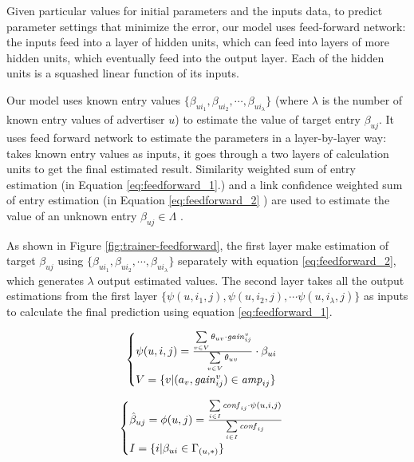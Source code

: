 Given particular values for initial parameters and the inputs data, to
predict parameter settings that minimize the error, our model uses
feed-forward network: the inputs feed into a layer of hidden units,
which can feed into layers of more hidden units, which eventually feed
into the output layer. Each of the hidden units is a squashed linear
function of its inputs.

Our {\sppan} model uses known entry values $\{\beta_{ui_1}, \beta_{ui_2},
\cdots, \beta_{ui_\lambda}\}$ (where $\lambda$ is the number of known
entry values of advertiser $u$) to estimate the value of target entry
$\beta_{uj}$.  It uses feed forward network to estimate the parameters
in a layer-by-layer way: takes known entry values as inputs, it goes
through a two layers of calculation units to get the final estimated
result.  Similarity weighted sum of entry estimation (in Equation
\ref{eq:feedforward_1}.) and a link confidence weighted sum of entry
estimation (in Equation \ref{eq:feedforward_2} ) are used to estimate
the value of an unknown entry $\beta_{uj} \in \Lambda$ .

As shown in Figure \ref{fig:trainer-feedforward}, the first layer make
estimation of target $\beta_{uj}$ using $\{\beta_{ui_1}, \beta_{ui_2},
\cdots, \beta_{ui_\lambda}\}$ separately with equation
\ref{eq:feedforward_2}, which generates $\lambda$ output estimated
values. The second layer takes all the output estimations from the
first layer $\{\psi(u,i_1,j),\psi(u,i_2,j),\cdots
\psi(u,i_\lambda,j)\}$ as inputs to calculate the final prediction
using equation \ref{eq:feedforward_1}.

\begin{equation}
  \label{eq:feedforward_2}
  \begin{cases}   
    \psi (u,i,j) = \frac{\sum \limits_{v\in V} \theta_{uv} \cdot \gain{{v}}{ij}}{\sum \limits_{v\in V} \theta_{uv}} \cdot \beta_{ui} \\
    V=\{v|(a_{v},\gain{{v}}{ij})\in\amp{ij}\}
   \end{cases}
\end{equation}

\begin{equation}
  \label{eq:feedforward_1}
  \begin{cases}    \hat{\beta}_{uj}=\phi(u,j)=\frac{\sum\limits_{i\in I} \confi{ij}\cdot \psi(u,i,j)}{\sum\limits_{i\in I} \confi{ij}} \\
  	    I=\{i|\beta_{ui}\in\Gamma_{(u,*)}\}
  \end{cases}
\end{equation}

